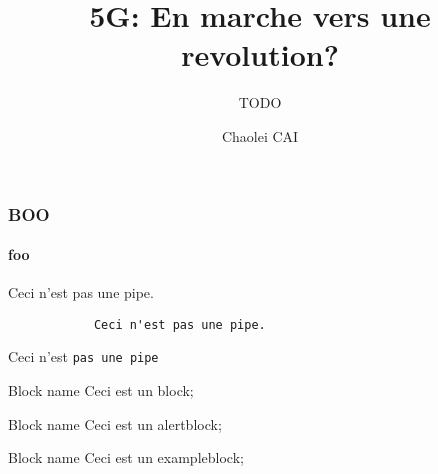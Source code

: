 \documentclass{beamer}
\subtitle{TODO}
\title{5G: En marche vers une revolution?}
\institute[Paris 8]{Paris VIII}
\author{Chaolei CAI}
\begin{document}
    \frame{\titlepage}
    \tableofcontents

    \begin{frame}[fragile]%
        \frametitle{BOO}
        \framesubtitle{foo}
        Ceci n'est pas une pipe.
        \begin{verbatim}
            Ceci n'est pas une pipe.
        \end{verbatim}
            Ceci n'est \texttt{pas une pipe}
    \end{frame}

    \begin{frame}
        \begin{block}{Block name}
            Ceci est un block;
        \end{block}
        \begin{alertblock}{Block name}
            Ceci est un alertblock;
        \end{alertblock}
        \begin{exampleblock}{Block name}
            Ceci est un exampleblock;
        \end{exampleblock}

    \end{frame}
\end{document}

